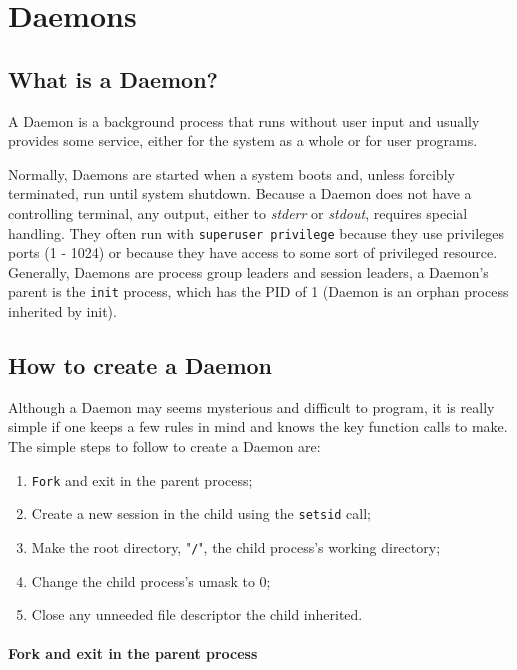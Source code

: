 \section{Daemons}
\label{sec:daemons}

\subsection{What is a Daemon?}
A Daemon is a background process that runs without user input and usually provides some service, either for the system as a whole or for user programs.

Normally, Daemons are started when a system boots and, unless forcibly terminated, run until system shutdown.
Because a Daemon does not have a controlling terminal, any output,
either to \textit{stderr} or \textit{stdout}, requires special handling.
They often run with \texttt{superuser privilege} because they use privileges
ports (1 - 1024) or because they have access to some sort of privileged resource.
Generally, Daemons are process group leaders and session leaders, a Daemon's parent is the \texttt{init} process, which has the PID of 1 (Daemon is an orphan process inherited by init).

\subsection{How to create a Daemon}
Although a Daemon may seems mysterious and difficult to program, it is really simple if one keeps a few rules in mind and knows the key function calls to make.
The simple steps to follow to create a Daemon are:

\begin{enumerate}
\item \texttt{Fork} and exit in the parent process;
\item Create a new session in the child using the \texttt{setsid} call;
\item Make the root directory, "\texttt{/}", the child process's working directory;
\item Change the child process's umask to 0;
\item Close any unneeded file descriptor the child inherited.
\end{enumerate}

\paragraph{\textbf{Fork and exit in the parent process}}

